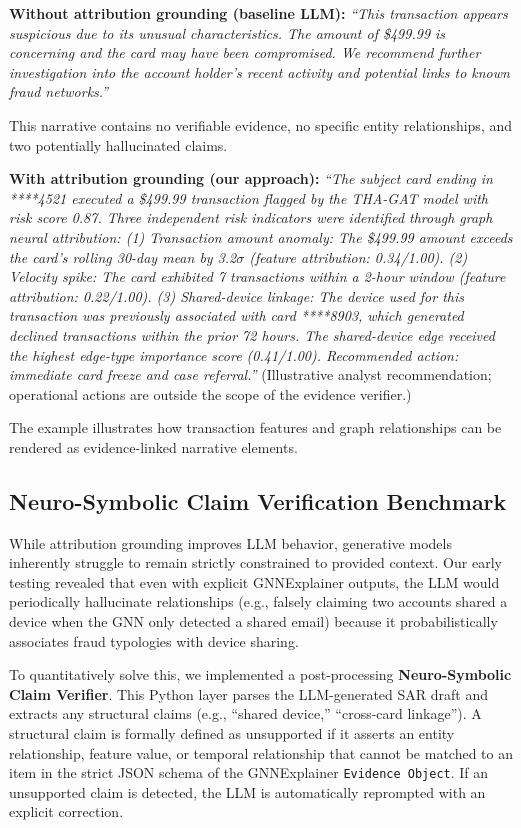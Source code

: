 \documentclass[journal]{IEEEtran}
\begin{document}
\textbf{Without attribution grounding (baseline LLM):}
\emph{``This transaction appears suspicious due to its unusual characteristics. The amount of \$499.99 is concerning and the card may have been compromised. We recommend further investigation into the account holder's recent activity and potential links to known fraud networks.''}

This narrative contains no verifiable evidence, no specific entity relationships, and two potentially hallucinated claims.

\textbf{With attribution grounding (our approach):}
\emph{``The subject card ending in ****4521 executed a \$499.99 transaction flagged by the THA-GAT model with risk score 0.87. Three independent risk indicators were identified through graph neural attribution: (1) Transaction amount anomaly: The \$499.99 amount exceeds the card's rolling 30-day mean by 3.2$\sigma$ (feature attribution: 0.34/1.00). (2) Velocity spike: The card exhibited 7 transactions within a 2-hour window (feature attribution: 0.22/1.00). (3) Shared-device linkage: The device used for this transaction was previously associated with card ****8903, which generated declined transactions within the prior 72 hours. The shared-device edge received the highest edge-type importance score (0.41/1.00). Recommended action: immediate card freeze and case referral.''} (Illustrative analyst recommendation; operational actions are outside the scope of the evidence verifier.)

The example illustrates how transaction features and graph relationships can be rendered as evidence-linked narrative elements.

\subsection{Neuro-Symbolic Claim Verification Benchmark}

While attribution grounding improves LLM behavior, generative models inherently struggle to remain strictly constrained to provided context. Our early testing revealed that even with explicit GNNExplainer outputs, the LLM would periodically hallucinate relationships (e.g., falsely claiming two accounts shared a device when the GNN only detected a shared email) because it probabilistically associates fraud typologies with device sharing.

To quantitatively solve this, we implemented a post-processing \textbf{Neuro-Symbolic Claim Verifier}. This Python layer parses the LLM-generated SAR draft and extracts any structural claims (e.g., ``shared device,'' ``cross-card linkage''). A structural claim is formally defined as unsupported if it asserts an entity relationship, feature value, or temporal relationship that cannot be matched to an item in the strict JSON schema of the GNNExplainer \texttt{Evidence Object}. If an unsupported claim is detected, the LLM is automatically reprompted with an explicit correction.
\end{document}
